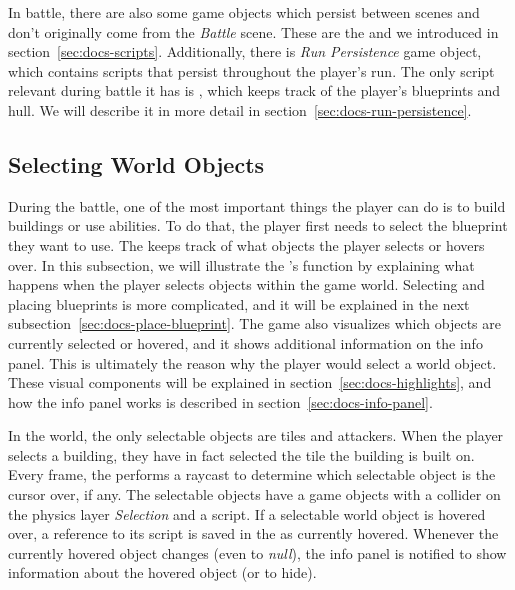 In battle, there are also some game objects which persist between scenes and don't originally come from the \emph{Battle} scene.
These are the  and  we introduced in section~\ref{sec:docs-scripts}.
Additionally, there is \emph{Run Persistence} game object, which contains scripts that persist throughout the player's run.
The only script relevant during battle it has is , which keeps track of the player's blueprints and hull.
We will describe it in more detail in section~\ref{sec:docs-run-persistence}.

\subsection{Selecting World Objects}

During the battle, one of the most important things the player can do is to build buildings or use abilities.
To do that, the player first needs to select the blueprint they want to use.
The  keeps track of what objects the player selects or hovers over.
In this subsection, we will illustrate the 's function by explaining what happens when the player selects objects within the game world.
Selecting and placing blueprints is more complicated, and it will be explained in the next subsection~\ref{sec:docs-place-blueprint}.
The game also visualizes which objects are currently selected or hovered, and it shows additional information on the info panel.
This is ultimately the reason why the player would select a world object.
These visual components will be explained in section~\ref{sec:docs-highlights}, and how the info panel works is described in section~\ref{sec:docs-info-panel}.

In the world, the only selectable objects are tiles and attackers.
When the player selects a building, they have in fact selected the tile the building is built on.
Every frame, the  performs a raycast to determine which selectable object is the cursor over, if any.
The selectable objects have a game objects with a collider on the physics layer \emph{Selection} and a  script.
If a selectable world object is hovered over, a reference to its  script is saved in the  as currently hovered.
Whenever the currently hovered object changes (even to \emph{null}), the info panel is notified to show information about the hovered object (or to hide).

